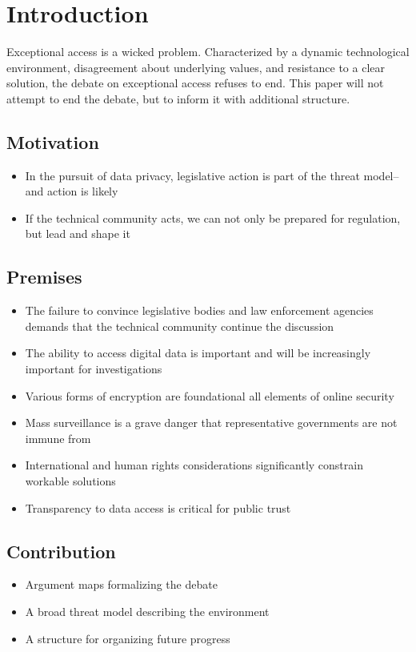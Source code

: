 \chapter{Introduction}
\label{chap-introduction}

Exceptional access is a wicked problem. Characterized by a dynamic technological environment, disagreement about
underlying values, and resistance to a clear solution, the debate on exceptional access refuses to end. This paper will
not attempt to end the debate, but to inform it with additional structure.

\section{Motivation}

\begin{itemize}
    \item In the pursuit of data privacy, legislative action is part of the threat model--and action is likely
    \item If the technical community acts, we can not only be prepared for regulation, but lead and shape it
\end{itemize}

\section{Premises}

\begin{itemize}
    \item The failure to convince legislative bodies and law enforcement agencies demands that the technical community continue the discussion
    \item The ability to access digital data is important and will be increasingly important for investigations
    \item Various forms of encryption are foundational all elements of online security
    \item Mass surveillance is a grave danger that representative governments are not immune from
    \item International and human rights considerations significantly constrain workable solutions
    \item Transparency to data access is critical for public trust
\end{itemize}

\section{Contribution}

\begin{itemize}
    \item Argument maps formalizing the debate
    \item A broad threat model describing the environment
    \item A structure for organizing future progress
\end{itemize}
